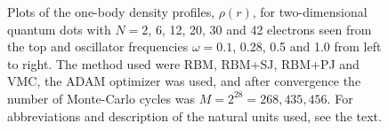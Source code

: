\begin{landscape}
\begin{figure}[H]
		\caption{Plots of the one-body density profiles, $\rho(r)$, for two-dimensional quantum dots with $N=2$, 6, 12, 20, 30 and 42 electrons seen from the top and oscillator frequencies $\omega=0.1$, 0.28, 0.5 and 1.0 from left to right. The method used were RBM, RBM+SJ, RBM+PJ and VMC, the ADAM optimizer was used, and after convergence the number of Monte-Carlo cycles was $M=2^{28}=268,435,456$. For abbreviations and description of the natural units used, see the text.}
		\label{fig:OB_interaction_2D_2}
	\end{figure}
	\begin{figure} [H]%
		\centering
		\captionsetup[subfigure]{labelformat=empty}
		\captionsetup{width=0.9\hsize}
		\hspace{0.cm}
		\hspace{-0.0cm}
		\hspace{-0.0cm}
		\hspace{-0.0cm}
		\\ [-0.3cm]
		

\end{figure}
\end{landscape}
